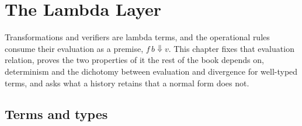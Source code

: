 \documentclass[11pt,openany]{book}
\theoremstyle{remark}
\begin{document}
\chapter{The Lambda Layer}
\label{ch:lambda}

Transformations and verifiers are lambda terms, and the operational rules
consume their evaluation as a premise, $f\,b\Downarrow v$. This chapter
fixes that evaluation relation, proves the two properties of it the rest
of the book depends on, determinism and the dichotomy between evaluation
and divergence for well-typed terms, and asks what a history retains that
a normal form does not.

\section{Terms and types}
\end{document}
